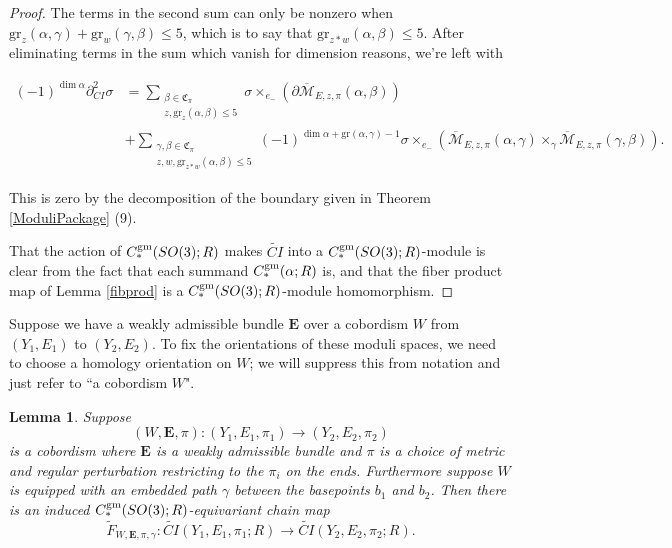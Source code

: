 \documentclass{memo-l}
\newtheorem{lemma}[theorem]{Lemma}
\theoremstyle{definition}
\theoremstyle{remark}
\numberwithin{section}{chapter}
\numberwithin{equation}{chapter}
\begin{document}
\begin{proof}
The terms in the second sum can only be nonzero when $\text{gr}_z(\alpha, \gamma) + \text{gr}_w(\gamma, \beta) \leq 5$, which is to say that $\text{gr}_{z \ast w}(\alpha, \beta) \leq 5$. After eliminating terms in the sum which vanish for dimension reasons, we're left with 

\begin{align*}(-1)^{\dim \alpha}\partial_{CI}^2 \sigma &= \sum_{\substack{\beta \in \mathfrak C_\pi\\z, \text{gr}_z(\alpha, \beta) \leq 5}}\sigma \times_{e_-} \left(\partial \overline{\mathcal M}_{E,z,\pi}(\alpha, \beta)\right) \\ 
&+ \sum_{\substack{\gamma, \beta \in \mathfrak C_\pi\\z, w, \text{gr}_{z \ast w}(\alpha,\beta) \leq 5}} (-1)^{\dim \alpha + \text{gr}(\alpha, \gamma) - 1} \sigma \times_{e_-} \left(\overline{\mathcal M}_{E,z,\pi}(\alpha, \gamma) \times_{\gamma} \overline{\mathcal M}_{E,z,\pi}(\gamma, \beta)\right).\end{align*}

This is zero by the decomposition of the boundary given in Theorem \ref{ModuliPackage} (9).

That the action of $C_*^{\textup{gm}}(SO(3);R)$ makes $\widetilde{CI}$ into a $C_*^{\textup{gm}}(SO(3);R)$-module is clear from the fact that each summand $C_*^{\textup{gm}}(\alpha;R)$ is, and that the fiber product map of Lemma \ref{fibprod} is a $C_*^{\textup{gm}}(SO(3);R)$-module homomorphism.
\end{proof}

Suppose we have a weakly admissible bundle $\mathbf{E}$ over a cobordism $W$ from $(Y_1, E_1)$ to $(Y_2, E_2)$. To fix the orientations of these moduli spaces, we need to choose a homology orientation on $W$; we will suppress this from notation and just refer to ``a cobordism $W$".

\begin{lemma}\label{inducedmap}Suppose $$(W,\mathbf{E},\pi): (Y_1, E_1,\pi_1) \to (Y_2, E_2,\pi_2)$$ is a cobordism where $\mathbf{E}$ is a weakly admissible bundle and $\pi$ is a choice of metric and regular perturbation restricting to the $\pi_i$ on the ends. Furthermore suppose $W$ is equipped with an embedded path $\gamma$ between the basepoints $b_1$ and $b_2$. Then there is an induced $C_*^{\textup{gm}}(SO(3);R)$-equivariant chain map $$\widetilde F_{W,\mathbf{E},\pi,\gamma}: \widetilde{CI}(Y_1, E_1, \pi_1;R) \to \widetilde{CI}(Y_2, E_2, \pi_2; R).$$ 
\end{lemma}
\end{document}
